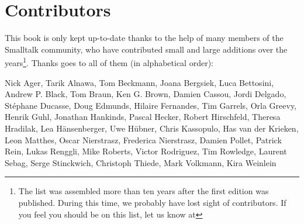\chapter*{Contributors}
This book is only kept up-to-date thanks to the help of many members of the Smalltalk community, who have contributed small and large additions over the years\footnote{The list was assembled more than ten years after the first edition was published. During this time, we probably have lost sight of contributors. If you feel you should be on this list, let us know at \sbeRepoUrl}. Thanks goes to all of them (in alphabetical order):

\sloppy
\begin{raggedright}
Nick Ager, Tarik Alnawa, Tom Beckmann, Joana Bergsiek, Luca Bettosini, Andrew P. Black, Tom Braun, Ken G. Brown, Damien Cassou, Jordi Delgado, St\'ephane Ducasse, Doug Edmunds, Hilaire Fernandes, Tim Garrels, Orla Greevy, Henrik Guhl, Jonathan Hankinds, Pascal Hecker, Robert Hirschfeld, Theresa Hradilak, Lea H\"ansenberger, Uwe H\"ubner, Chris Kassopulo, Has van der Krieken, Leon Matthes, Oscar Nierstrasz, Frederica Nierstrasz, Damien Pollet, Patrick Rein, Lukas Renggli, Mike Roberts, Victor Rodriguez, Tim Rowledge, Laurent Sebag, Serge Stinckwich, Christoph Thiede, Mark Volkmann, Kira Weinlein
\end{raggedright}
\fussy
%
%
